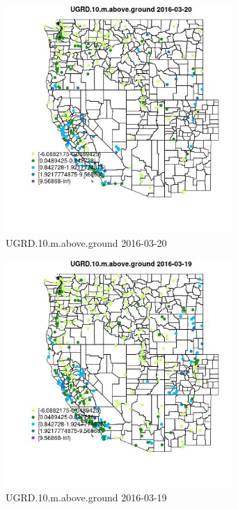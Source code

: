 \begin{figure} 
\centering  
\includegraphics[width=0.77\textwidth]{Code_Outputs/Report_ML_input_PM25_Step4_part_e_de_duplicated_aveswNAs_MapObsUGRD10maboveground2016-03-20.jpg} 
\caption{\label{fig:Report_ML_input_PM25_Step4_part_e_de_duplicated_aveswNAsMapObsUGRD10maboveground2016-03-20}UGRD.10.m.above.ground 2016-03-20} 
\end{figure} 
 

\begin{figure} 
\centering  
\includegraphics[width=0.77\textwidth]{Code_Outputs/Report_ML_input_PM25_Step4_part_e_de_duplicated_aveswNAs_MapObsUGRD10maboveground2016-03-19.jpg} 
\caption{\label{fig:Report_ML_input_PM25_Step4_part_e_de_duplicated_aveswNAsMapObsUGRD10maboveground2016-03-19}UGRD.10.m.above.ground 2016-03-19} 
\end{figure} 
 

